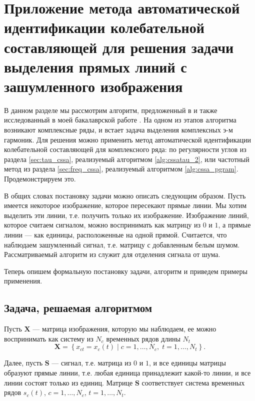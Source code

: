 \documentclass[specialist,
               substylefile = spbu.rtx,
               subf,href,colorlinks=true, 12pt]{disser}
\begin{document}
\section{Приложение метода автоматической идентификации колебательной составляющей для решения задачи выделения прямых линий с зашумленного изображения}
\label{sec:use_cssa}

В данном разделе мы рассмотрим алгоритм, предложенный в \cite{Trickett2003} и также исследованный в моей бакалаврской работе \cite{Zhornikova2016}.
На одном из этапов алгоритма возникают комплексные ряды, и встает задача выделения комплексных э-м гармоник.
Для решения можно применить метод автоматической идентификации колебательной составляющей для комплексного ряда: по регулярности углов  из раздела \ref{sec:tau_cssa}, реализуемый алгоритмом \ref{alg:cssatau_2}, или частотный метод из раздела \ref{sec:freq_cssa}, реализуемый алгоритмом \ref{alg:cssa_pgram}. Продемонстрируем это.

В общих словах постановку задачи можно описать следующим образом. Пусть имеется некоторое изображение, которое пересекают прямые линии. Мы хотим выделить эти линии, т.е. получить только их изображение.
Изображение линий, которое считаем сигналом, можно воспринимать как матрицу из $0$ и $1$, а прямые линии --- как единицы, расположенные на одной прямой. Считается, что наблюдаем зашумленный сигнал, т.е. матрицу с добавленным белым шумом.
Рассматриваемый алгоритм из \cite{Trickett2003} служит для отделения сигнала от шума.

Теперь опишем формальную постановку задачи, алгоритм и приведем примеры применения.

\subsection{Задача, решаемая алгоритмом} \label{sec:chapter3_task}
Пусть $\mathbf{X}$ --- матрица изображения, которую мы наблюдаем, ее можно воспринимать как систему из $N_c$ временных рядов длины $N_t$
\begin{equation*}
	\mathbf{X}=\left\{x_{ct}=x_c(t) \; | \; c=1, \ldots, N_c, \; t=1, \ldots, N_t\right\}.
\end{equation*}

Далее, пусть $\mathbf{S}$ --- сигнал, т.е. матрица из $0$ и $1$, и все единицы матрицы образуют прямые линии, т.е. любая единица принадлежит какой-то линии, и все линии состоят только из единиц. Матрице $\mathbf{S}$ соответствует система временных рядов $s_c(t)$, $c=1, \ldots, N_c$, $t=1, \ldots, N_t$.
\end{document}
